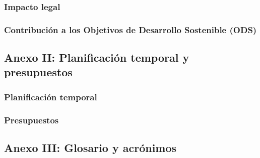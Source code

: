 \documentclass[a4paper, 12pt, spanish, twoside]{article}
\begin{document}
\subsubsection{Impacto legal} \label{sec:anexo1:legal}
\subsubsection{Contribución a los Objetivos de Desarrollo Sostenible (ODS)} \label{sec:ods}

\clearpage




\newpage
\subsection{Anexo II: Planificación temporal y presupuestos} \label{sec:anexo2}
\subsubsection{Planificación temporal} \label{sec:anexo2:temporal}
\subsubsection{Presupuestos} \label{sec:anexo2:presupuestos}

\clearpage




\newpage
\subsection{Anexo III: Glosario y acrónimos} \label{sec:anexo3}

\glsaddall

\end{document}
